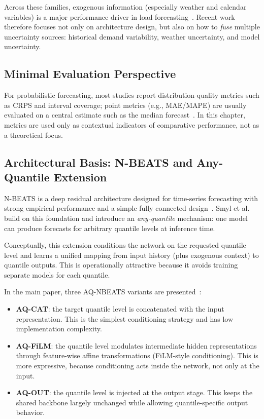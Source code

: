 Across these families, exogenous information (especially weather and calendar variables) is a major performance driver in load forecasting~\cite{hong2016probabilistic}. Recent work therefore focuses not only on architecture design, but also on how to \emph{fuse} multiple uncertainty sources: historical demand variability, weather uncertainty, and model uncertainty.

\subsection{Minimal Evaluation Perspective}
\label{subsec:min_metrics}

For probabilistic forecasting, most studies report distribution-quality metrics such as CRPS and interval coverage; point metrics (e.g., MAE/MAPE) are usually evaluated on a central estimate such as the median forecast~\cite{gneiting2007strictly}. In this chapter, metrics are used only as contextual indicators of comparative performance, not as a theoretical focus.

\subsection{Architectural Basis: N-BEATS and Any-Quantile Extension}
\label{subsec:arch_basis}

N-BEATS is a deep residual architecture designed for time-series forecasting with strong empirical performance and a simple fully connected design~\cite{oreshkin2020nbeats}. Smyl et al.~\cite{smyl2025anyquantile} build on this foundation and introduce an \emph{any-quantile} mechanism: one model can produce forecasts for arbitrary quantile levels at inference time.

Conceptually, this extension conditions the network on the requested quantile level and learns a unified mapping from input history (plus exogenous context) to quantile outputs. This is operationally attractive because it avoids training separate models for each quantile.

In the main paper, three AQ-NBEATS variants are presented~\cite{smyl2025anyquantile}:
\begin{itemize}
    \item \textbf{AQ-CAT}: the target quantile level is concatenated with the input representation. This is the simplest conditioning strategy and has low implementation complexity.
    \item \textbf{AQ-FiLM}: the quantile level modulates intermediate hidden representations through feature-wise affine transformations (FiLM-style conditioning). This is more expressive, because conditioning acts inside the network, not only at the input.
    \item \textbf{AQ-OUT}: the quantile level is injected at the output stage. This keeps the shared backbone largely unchanged while allowing quantile-specific output behavior.
\end{itemize}


